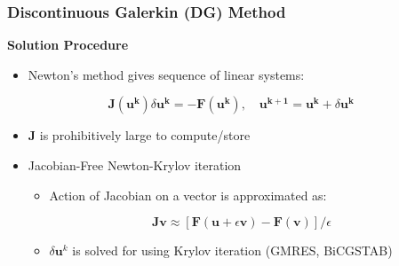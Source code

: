 \documentclass[9pt]{beamer}
\newcommand{\bv}[1]{\mathbf{#1}}
\begin{document}
\begin{frame}
\frametitle{Discontinuous Galerkin (DG) Method}
\label{sec-4-11}

\textbf{Solution Procedure}
\begin{itemize}
\item Newton's method gives sequence of linear systems:
\end{itemize}
$$\bv{J}(\bv{u^{k}}) \delta \bv{u^k} = -\bv{F}(\bv{u^{k}}),\quad \bv{u^{k+1}}=\bv{u^{k}}+\delta \bv{u^k}$$
\begin{itemize}
\item $\bv{J}$ is prohibitively large to compute/store
\item Jacobian-Free Newton-Krylov iteration
\begin{itemize}
\item Action of Jacobian on a vector is approximated as:
\end{itemize}
$$ \bv{J} \bv{v} \approx [\bv{F}(\bv{u} + \epsilon \bv{v}) - \bv{F}(\bv{v})]/\epsilon$$
\begin{itemize}
\item $\delta \bv{u}^k$ is solved for using Krylov iteration (GMRES, BiCGSTAB)
\end{itemize}
\end{itemize}
\end{frame}
\end{document}

